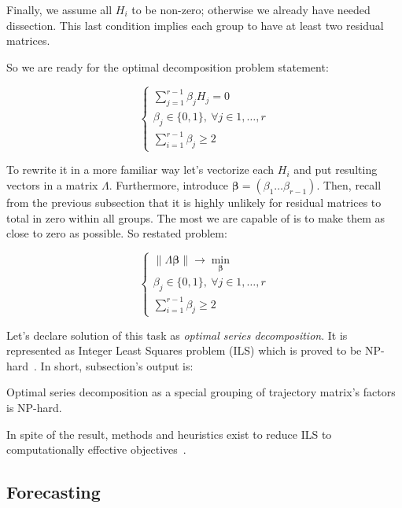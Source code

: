 	Finally, we assume all $ H_i $ to be non-zero; otherwise we already have needed dissection. This last condition implies each group to have at least two residual matrices.
	
	So we are ready for the optimal decomposition problem statement:
	
	\begin{equation}
		\begin{cases*}
			\sum\limits_{j = 1}^{r - 1} \beta_j H_j = 0 \\
			\beta_j \in \{0, 1\}, \ \forall j \in 1, \ldots, r \\
			\sum\limits_{i = 1}^{r - 1} \beta_j \ge 2
		\end{cases*}
	\end{equation}
	
	To rewrite it in a more familiar way let's vectorize each $ H_i $ and put resulting vectors in a matrix $ \Lambda $. Furthermore, introduce $ \boldsymbol{\beta} = (\beta_1 \ldots \beta_{r-1}) $. Then, recall from the previous subsection that it is highly unlikely for residual matrices to total in zero within all groups. The most we are capable of is to make them as close to zero as possible. So restated problem:
	
	\begin{equation}\label{eq:decomp_search_final}
		\begin{cases*}
			\lVert \Lambda \boldsymbol{\beta} \rVert \to \underset{\boldsymbol{\beta}}{\min} \\
			\beta_j \in \{0, 1\}, \ \forall j \in 1, \ldots, r \\
			\sum\limits_{i = 1}^{r - 1} \beta_j \ge 2
		\end{cases*}
	\end{equation}
	
	Let's declare solution of this task as \emph{optimal series decomposition}. It is represented as Integer Least Squares problem (ILS) which is proved to be NP-hard~\cite{van1981another}. In short, subsection's output is:
	
	\begin{Th}
		Optimal series decomposition as a special grouping of trajectory matrix's factors is NP-hard.
	\end{Th}
	
	In spite of the result, methods and heuristics exist to reduce ILS to computationally effective objectives~\cite{Grafarend2022}.
	
	\subsection*{Forecasting}\label{sec:tssa_forecast}
	
